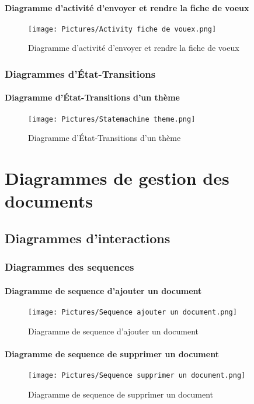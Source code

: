 \documentclass[11pt,fleqn]{book} %
\begin{document}
\subsubsection{Diagramme d'activité d'envoyer et rendre la fiche de voeux}
\begin{figure}[h]
    \centering
    \texttt{[image: Pictures/Activity fiche de vouex.png]}
    \caption{Diagramme d'activité d'envoyer et rendre la fiche de voeux}
    \label{fig:pca}
\end{figure}
\newpage
\subsection{Diagrammes d’État-Transitions}
\subsubsection{Diagramme d’État-Transitions d'un thème}
\begin{figure}[h]
    \centering
    \texttt{[image: Pictures/Statemachine theme.png]}
    \caption{Diagramme d’État-Transitions d'un thème}
    \label{fig:pca}
\end{figure}
\chapter{Diagrammes de gestion des documents}
\section{Diagrammes d'interactions}
\subsection{Diagrammes des sequences}
\newpage
\subsubsection{Diagramme de sequence d'ajouter un document}
\begin{figure}[h]
    \centering
    \texttt{[image: Pictures/Sequence ajouter un document.png]}
    \caption{Diagramme de sequence d'ajouter un document}
    \label{fig:pca}
\end{figure}
\newpage
\subsubsection{Diagramme de sequence de supprimer un document}
\begin{figure}[h]
    \centering
    \texttt{[image: Pictures/Sequence supprimer un document.png]}
    \caption{Diagramme de sequence de supprimer un document}
    \label{fig:pca}
\end{figure}
\newpage
\end{document}
